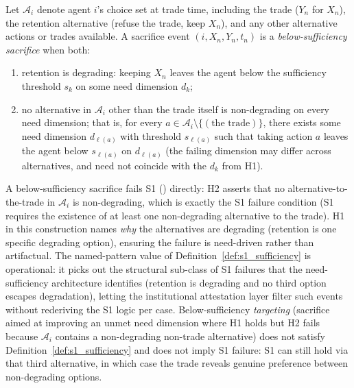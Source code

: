 \begin{definition}
\label{def:s1_sufficiency}
Let $\mathcal{A}_i$ denote agent $i$'s choice set at trade
time, including the trade ($Y_n$ for $X_n$), the retention
alternative (refuse the trade, keep $X_n$), and any other
alternative actions or trades available.  A sacrifice event
$(i, X_n, Y_n, t_n)$ is a \emph{below-sufficiency sacrifice}
when both:
\begin{enumerate}
\item[(H1)] retention is degrading: keeping $X_n$ leaves the
  agent below the sufficiency threshold $s_k$ on some need
  dimension $d_k$;
\item[(H2)] no alternative in $\mathcal{A}_i$ other than the
  trade itself is non-degrading on every need dimension; that
  is, for every $a \in \mathcal{A}_i \setminus \{(\text{the
  trade})\}$, there exists some need dimension $d_{\ell(a)}$
  with threshold $s_{\ell(a)}$ such that taking action $a$
  leaves the agent below $s_{\ell(a)}$ on $d_{\ell(a)}$ (the
  failing dimension may differ across alternatives, and need
  not coincide with the $d_k$ from H1).
\end{enumerate}
\end{definition}

\begin{remark}
\label{rem:s1_sufficiency_failure}
A below-sufficiency sacrifice fails S1
(\citep[Revealed~Sacrifice]{lasser2026paper8a}) directly: H2 asserts that no
alternative-to-the-trade in $\mathcal{A}_i$ is non-degrading,
which is exactly the S1 failure condition (S1 requires the
existence of at least one non-degrading alternative to the
trade).  H1 in this construction names \emph{why} the
alternatives are degrading (retention is one specific
degrading option), ensuring the failure is need-driven rather
than artifactual.  The named-pattern value of
Definition~\ref{def:s1_sufficiency} is operational: it picks
out the structural sub-class of S1 failures that the
need-sufficiency architecture identifies (retention is
degrading and no third option escapes degradation), letting
the institutional attestation layer filter such events
without rederiving the S1 logic per case.
Below-sufficiency \emph{targeting} (sacrifice aimed at
improving an unmet need dimension where H1 holds but H2 fails
because $\mathcal{A}_i$ contains a non-degrading non-trade
alternative) does not satisfy
Definition~\ref{def:s1_sufficiency} and does not imply S1
failure: S1 can still hold via that third alternative, in
which case the trade reveals genuine preference between
non-degrading options.
\end{remark}

